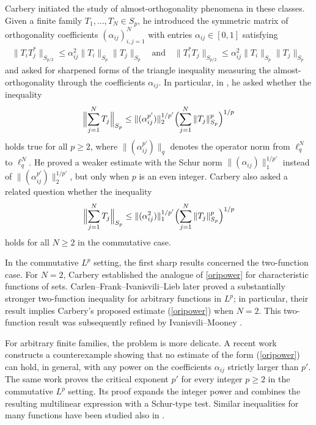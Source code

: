 \documentclass[11pt]{article}
\theoremstyle{definition}
\newcommand{\1}{\mathbf{1}}
\begin{document}
Carbery  \cite{Carbery2009}  initiated the study of almost-orthogonality phenomena in these classes. Given a finite family $T_1,\dots,T_N\in S_p$, he introduced the symmetric matrix of orthogonality coefficients  $(\alpha_{ij})_{i,j=1}^{N}$ with entries $\alpha_{ij} \in [0,1]$  satisfying
\begin{align}\label{carbp}
\|T_i T^{*}_j\|_{S_{p/2}} \leq \alpha_{ij}^{2} \|T_i\|_{S_p}\|T_j\|_{S_p} \quad \text{and} \quad \|T^{*}_i T_j\|_{S_{p/2}} \leq \alpha_{ij}^{2} \|T_i\|_{S_p}\|T_j\|_{S_p}
\end{align}
and asked for sharpened forms of the triangle inequality measuring the almost-orthogonality through the coefficients $\alpha_{ij}$. In particular, in \cite[Section~3.3, (3.1)]{Carbery2009}, he asked whether the inequality
\begin{align}\label{enisori}
\Bigl\|\sum_{j=1}^N T_j\Bigr\|_{S_p}
\leq
\|(\alpha_{ij}^{p'})\|_{2}^{1/p'}
\Bigl(\sum_{j=1}^N\|T_j\|_{S_p}^p\Bigr)^{1/p}
\end{align}
holds true for all $p\geq 2$, where $\| (\alpha_{ij}^{p'})\|_{q}$ denotes the operator norm from $\ell_{q}^{N}$ to $\ell_{q}^{N}$. He proved \cite[Theorem~1.3]{Carbery2009} a weaker estimate with the Schur norm $\|(\alpha_{ij})\|_{1}^{1/p'}$ instead of  $\|(\alpha_{ij}^{p'})\|_{2}^{1/p'}$, but only when $p$ is an even integer. Carbery also asked a related question \cite[Section~3.5]{Carbery2009} whether the inequality 
\begin{align}\label{oripower}
\Bigl\|\sum_{j=1}^N T_j\Bigr\|_{S_p}
\leq
\|(\alpha_{ij}^{2})\|_{1}^{1/p'}
\Bigl(\sum_{j=1}^N\|T_j\|_{S_p}^p\Bigr)^{1/p}
\end{align}
holds for all $N\geq 2$ in the commutative case. 

In the commutative $L^p$ setting, the first sharp results concerned the two-function case. For $N=2$, Carbery \cite[Proposition~3.1]{Carbery2009} established the analogue of \eqref{oripower} for characteristic functions of sets. Carlen--Frank--Ivanisvili--Lieb \cite{CFIL2021} later proved a substantially stronger two-function inequality for arbitrary functions in $L^p$; in particular, their result implies Carbery's proposed estimate (\ref{oripower}) when $N=2$. This two-function result was subsequently refined by Ivanisvili--Mooney \cite{IvanisviliMooney2020}. 

For arbitrary finite families, the problem is more delicate. A recent work \cite{CDPIMW2026} constructs a counterexample showing that no estimate of the form (\ref{oripower}) can hold, in general, with any power on the coefficients $\alpha_{ij}$ strictly larger than $p'$. The same work proves the critical exponent $p'$ for every integer $p\geq 2$ in the commutative $L^{p}$ setting. Its proof expands the integer power and combines the resulting multilinear expression with a Schur-type test. Similar inequalities for many functions have been studied also in \cite{CFL2020}. 
\end{document}
